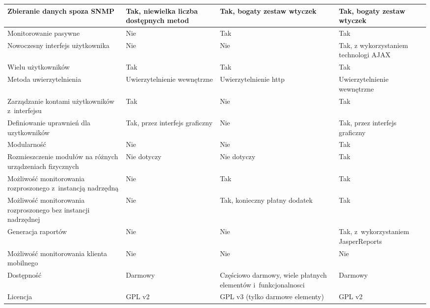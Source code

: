 \begin{longtable}[c]{|p{4.5cm}||p{3cm}|p{3cm}|p{3cm}|}
  \raggedright{Zbieranie danych spoza SNMP} & \raggedright{Tak, niewielka liczba dostępnych metod} &
  \raggedright{Tak, bogaty zestaw wtyczek} & \raggedright{Tak, bogaty zestaw wtyczek}
  \tabularnewline
  \hline

  \raggedright{Monitorowanie pasywne} & \raggedright{Nie} &
  \raggedright{Tak} & \raggedright{Tak}
  \tabularnewline
  \hline

  \raggedright{Nowoczesny interfejs użytkownika} & \raggedright{Nie} &
  \raggedright{Nie} & \raggedright{Tak, z wykorzystaniem technologi AJAX}
  \tabularnewline
  \hline

  \raggedright{Wielu użytkowników} & \raggedright{Tak} &
  \raggedright{Tak} & \raggedright{Tak}
  \tabularnewline
  \hline

  \raggedright{Metoda uwierzytelnienia} & \raggedright{Uwierzytelnienie wewnętrzne} &
  \raggedright{Uwierzytelnienie http} & \raggedright{Uwierzytelnienie wewnętrzne}
  \tabularnewline
  \hline

  \raggedright{Zarządzanie kontami użytkowników z~interfejsu} & \raggedright{Tak} &
  \raggedright{Nie} & \raggedright{Tak}
  \tabularnewline
  \hline

  \raggedright{Definiowanie uprawnień dla uzytkowników} & \raggedright{Tak, przez interfejs graficzny} &
  \raggedright{Nie} & \raggedright{Tak, przez interfejs graficzny}
  \tabularnewline
  \hline

  \raggedright{Modularność} & \raggedright{Nie} &
  \raggedright{Nie} & \raggedright{Tak}
  \tabularnewline
  \hline

  \raggedright{Rozmieszczenie modułów na różnych urządzeniach fizycznych} & \raggedright{Nie dotyczy} &
  \raggedright{Nie dotyczy} & \raggedright{Tak}
  \tabularnewline
  \hline

  \raggedright{Możliwość monitorowania rozproszonego z~instancją
    nadrzędną} & \raggedright{Nie} & \raggedright{Tak} &
  \raggedright{Tak}
  \tabularnewline
  \hline

  \raggedright{Możliwość monitorowania rozproszonego bez instancji nadrzędnej} & \raggedright{Nie} &
  \raggedright{Tak, konieczny płatny dodatek} & \raggedright{Tak}
  \tabularnewline
  \hline

  \raggedright{Generacja raportów} & \raggedright{Nie} &
  \raggedright{Nie} & \raggedright{Tak, z~wykorzystaniem JasperReports}
  \tabularnewline
  \hline

  \raggedright{Możliwość monitorowania klienta mobilnego} & \raggedright{Nie} &
  \raggedright{Nie} & \raggedright{Nie}
  \tabularnewline
  \hline

  \raggedright{Dostępność} & \raggedright{Darmowy} &
  \raggedright{Częściowo darmowy, wiele płatnych elementów i~funkcjonalnosci} & \raggedright{Darmowy}
  \tabularnewline
  \hline

  \raggedright{Licencja} & \raggedright{GPL v2} &
  \raggedright{GPL v3 (tylko darmowe elementy)} & \raggedright{GPL v2}
  \tabularnewline
  \hline

\end{longtable}


